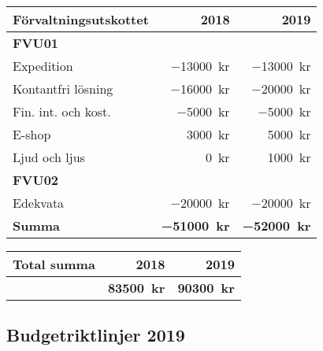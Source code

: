 \documentclass[../_main/handlingar.tex]{subfiles}
\begin{document}
\begin{tabularx}{10cm}{X r r}
    \textbf{\large Förvaltningsutskottet} & \textbf{2018} & \textbf{2019} \\
    \hline
    \textbf{FVU01} \\
    Expedition & \SI{-13000}{kr} & \SI{-13000}{kr} \\
    Kontantfri lösning & \SI{-16000}{kr} & \SI{-20000}{kr} \\
    Fin. int. och kost. & \SI{-5000}{kr} & \SI{-5000}{kr} \\
    E-shop & \SI{3000}{kr} & \SI{5000}{kr} \\
    Ljud och ljus & \SI{0}{kr} & \SI{1000}{kr}\\
    \textbf{FVU02} \\
    Edekvata & \SI{-20000}{kr} & \SI{-20000}{kr} \\
    \hline
    \textbf{Summa} & \textbf{\SI{-51000}{kr}} & \textbf{\SI{-52000}{kr}} \\
\end{tabularx}

\begin{tabularx}{10cm}{X r r}
    \textbf{\large Total summa} & \textbf{2018} & \textbf{2019} \\
    \hline
     & \textbf{\SI{83500}{kr}} & \textbf{\SI{90300}{kr}} \\
\end{tabularx}


\newpage
\subsection*{Budgetriktlinjer 2019}
\end{document}
